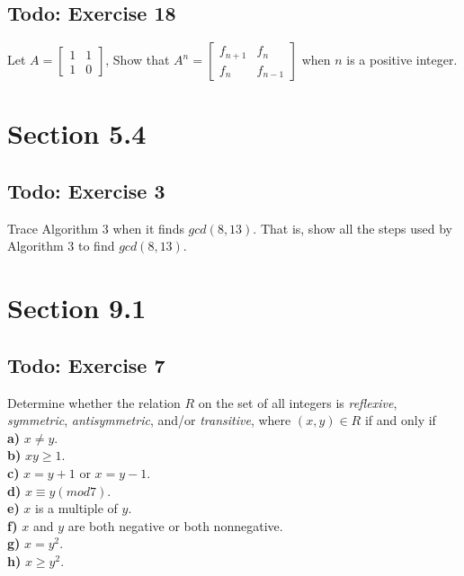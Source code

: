 \documentclass[12pt]{article}
\begin{document}
    \subsection{Todo: Exercise 18}
    Let 
    $ A =
    \begin{bmatrix}
        1 & 1 \\
        1 & 0  
    \end{bmatrix}
    $,
    Show that 
    $ A^n = \begin{bmatrix}
                    f_{n+1} & f_n\\
                    f_n & f_{n-1}
                    \end{bmatrix}
    $   when $n$ is a positive integer.

    \section{Section 5.4}
    \subsection{Todo: Exercise 3}
    Trace Algorithm 3 when it finds $gcd(8,13)$. That is, show all the steps used by Algorithm 3 to find $gcd(8,13)$.

    \section{Section 9.1}
    \subsection{Todo: Exercise 7}
    Determine whether the relation $R$ on the set of all integers is \textit{reflexive}, \textit{symmetric}, \textit{antisymmetric}, and/or \textit{transitive}, where $(x,y) \in R$ if and only if\\
    \textbf{a)} $ x \neq y$.\\
    \textbf{b)} $ xy \geq 1$.\\
    \textbf{c)} $ x=y + 1$ or $ x=y-1$.\\
    \textbf{d)} $ x \equiv y (mod 7) $.\\
    \textbf{e)} $ x $ is a multiple of $y$.\\
    \textbf{f)} $ x $ and $y$ are both negative or both nonnegative.\\
    \textbf{g)} $ x=y^2 $.\\
    \textbf{h)} $ x \geq y^2 $.
\end{document}
